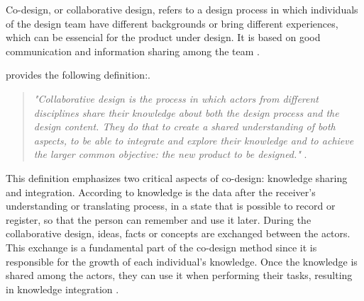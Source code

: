 Co-design, or collaborative design, refers to a design process in which individuals of the design team have different backgrounds or bring different experiences, which can be essencial for the product under design. It is based on good communication and information sharing among the team \cite{chiu2002organizational}.

 provides the following definition:.

\begin{quote}
    \textit{"Collaborative design is the process in which actors from different disciplines share their knowledge about both the design process and the design content. They do that to create a shared understanding of both aspects, to be able to integrate and explore their knowledge and to achieve the larger common objective: the new product to be designed."} \cite{kleinsmann2006understanding}.
\end{quote}

This definition emphasizes two critical aspects of co-design: knowledge sharing and integration. According to  knowledge is the data after the receiver’s understanding or translating process, in a state that is possible to record or register, so that the person can remember and use it later. During the collaborative design, ideas, facts or concepts are exchanged between the actors. This exchange is a fundamental part of the co-design method since it is responsible for the growth of each individual’s knowledge. Once the knowledge is shared among the actors, they can use it when performing their tasks, resulting in knowledge integration \cite{kleinsmann2006understanding}.